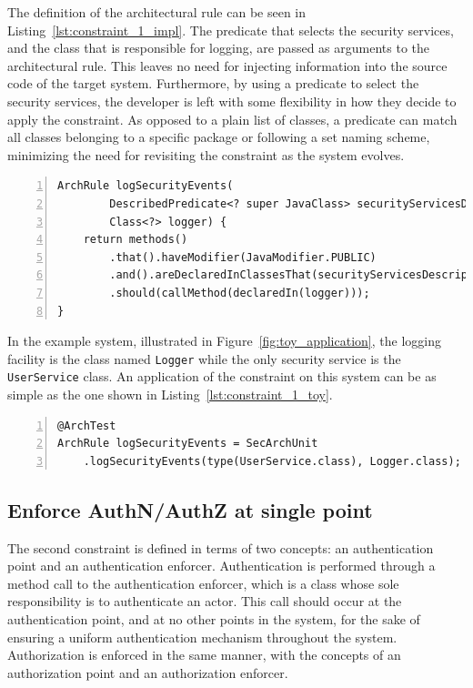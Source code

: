The definition of the architectural rule can be seen in Listing~\ref{lst:constraint_1_impl}. The predicate that selects the security services, and the class that is responsible for logging, are passed as arguments to the architectural rule. This leaves no need for injecting information into the source code of the target system. Furthermore, by using a predicate to select the security services, the developer is left with some flexibility in how they decide to apply the constraint. As opposed to a plain list of classes, a predicate can match all classes belonging to a specific package or following a set naming scheme, minimizing the need for revisiting the constraint as the system evolves.

\begin{minipage}{\linewidth}
\begin{lstlisting}[caption={Rule definition for constraint 1.}, captionpos=b, label=lst:constraint_1_impl, numbers=left]
ArchRule logSecurityEvents(
        DescribedPredicate<? super JavaClass> securityServicesDescriptor,
        Class<?> logger) {
    return methods()
        .that().haveModifier(JavaModifier.PUBLIC)
        .and().areDeclaredInClassesThat(securityServicesDescriptor)
        .should(callMethod(declaredIn(logger)));
}
\end{lstlisting}
\end{minipage}

In the example system, illustrated in Figure~\ref{fig:toy_application}, the logging facility is the class named \texttt{Logger} while the only security service is the \texttt{UserService} class. An application of the constraint on this system can be as simple as the one shown in Listing~\ref{lst:constraint_1_toy}.

\begin{minipage}{\linewidth}
\begin{lstlisting}[caption={Application of constraint 1 to the example system.}, captionpos=b, label=lst:constraint_1_toy, numbers=left]
@ArchTest
ArchRule logSecurityEvents = SecArchUnit
    .logSecurityEvents(type(UserService.class), Logger.class);
\end{lstlisting}
\end{minipage}

\subsection{Enforce AuthN/AuthZ at single point}
The second constraint is defined in terms of two concepts: an authentication point and an authentication enforcer. Authentication is performed through a method call to the authentication enforcer, which is a class whose sole responsibility is to authenticate an actor. This call should occur at the authentication point, and at no other points in the system, for the sake of ensuring a uniform authentication mechanism throughout the system. Authorization is enforced in the same manner, with the concepts of an authorization point and an authorization enforcer.

